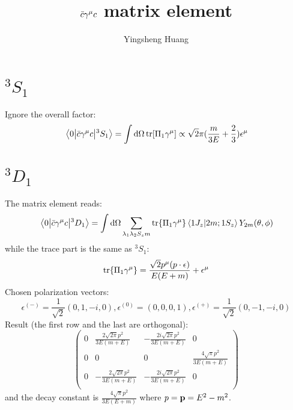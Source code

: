 \documentclass{article}
\title{$\bar c\gm c$ matrix element}
\author{Yingsheng Huang}
\newcommand{\gm}{\gamma^{\mu}}
\newcommand{\la}{\lambda}
\begin{document}
\maketitle
\section{$^3S_1$}
Ignore the overall factor:
$$\mel{0}{\bar c\gm c}{^3S_1}=\int\dd\Omega\tr[\Pi_1\gm]\propto\sqrt{2}\pi(\frac{m}{3 E}+\frac{2}{3})\epsilon^{\mu}$$
\section{$^3D_1$}
The matrix element reads:
$$\mel{0}{\bar c\gm c}{^3D_1}=\int\dd\Omega\sum_{\la_1\la_2 S_zm}\tr{\Pi_1\gm}\braket{1J_z}{2m;1S_z}Y_{2m}(\theta,\phi)$$
while the trace part is the same as $^3S_1$:
$$\tr{\Pi_1\gm}=\frac{\sqrt{2}p^{\mu}(p\cdot\epsilon)}{E(E+m)}+\epsilon^{\mu}$$
Chosen polarization vectors: 
$$\epsilon^{(-)}=\frac{1}{\sqrt{2}}(0,1,-i,0),\epsilon^{(0)}=(0,0,0,1),\epsilon^{(+)}=\frac{1}{\sqrt{2}}(0,-1,-i,0)$$
Result (the first row and the last are orthogonal):  
$$\left(
\begin{array}{cccc}
 0 & \frac{2 \sqrt{2 \pi } p^2}{3 E (m+E)} & -\frac{2 i \sqrt{2 \pi } p^2}{3 E (m+E)} & 0 \\
 0 & 0 & 0 & \frac{4 \sqrt{\pi } p^2}{3 E (m+E)} \\
 0 & -\frac{2 \sqrt{2 \pi } p^2}{3 E (m+E)} & -\frac{2 i \sqrt{2 \pi } p^2}{3 E (m+E)} & 0 \\
\end{array}
\right)$$
and the decay constant is $\frac{4 \sqrt{\pi } p^2}{3 E (E+m)}$ where $p=\vb{p}=E^2-m^2$.
\end{document}

